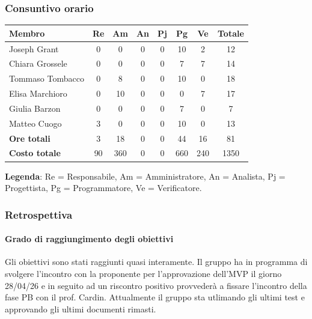 \documentclass[11pt,a4paper]{article}
\begin{document}
\subsubsection{Consuntivo orario}
\begin{center}
    \begin{tabular}{|l|c|c|c|c|c|c|c|}
        \hline
        \textbf{Membro} & \textbf{Re} & \textbf{Am} & \textbf{An} & \textbf{Pj} & \textbf{Pg} & \textbf{Ve} & \textbf{Totale} \\
        \hline
        Joseph Grant        & 0 & 0 & 0 & 0 & 10 & 2 & 12 \\
        \hline
        Chiara Grossele     & 0 & 0 & 0 & 0 & 7 & 7 & 14 \\
        \hline
        Tommaso Tombacco    & 0 & 8 & 0 & 0 & 10 & 0 & 18 \\
        \hline
        Elisa Marchioro     & 0 & 10 & 0 & 0 & 0 & 7 & 17 \\
        \hline
        Giulia Barzon       & 0 & 0 & 0 & 0 & 7 & 0 & 7 \\
        \hline
        Matteo Cuogo        & 3 & 0 & 0 & 0 & 10 & 0 & 13 \\
        \hline
        \textbf{Ore totali} & 3 & 18 & 0 & 0 & 44 & 16 & 81 \\
        \hline
        \textbf{Costo totale} & 90 & 360 & 0 & 0 & 660 & 240 & 1350 \\
        \hline
    \end{tabular}
\end{center}

\noindent \textbf{Legenda}: Re = Responsabile, Am = Amministratore, An = Analista, Pj = Progettista, Pg = Programmatore, Ve = Verificatore.

\subsubsection{Retrospettiva}
\paragraph{Grado di raggiungimento degli obiettivi}
Gli obiettivi sono stati raggiunti quasi interamente. Il gruppo ha in programma di svolgere l'incontro con la proponente per l'approvazione dell'MVP il giorno 28/04/26 e in seguito ad un riscontro positivo provvederà a fissare l'incontro della fase PB con il prof. Cardin. Attualmente il gruppo sta utlimando gli ultimi test e approvando gli ultimi documenti rimasti. 
\end{document}
